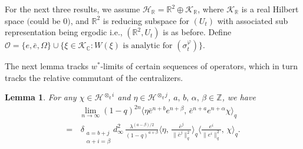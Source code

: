 \documentclass[12pt, a4paper,reqno]{amsart}
\newtheorem{Lemma}[Theorem]{Lemma}
\theoremstyle{definition}
\def\C{\mathbb C}
\def\R{\mathbb R}
\newcommand{\CH}{\mathcal{H}}
\begin{document}
For the next three results, we assume $\CH_\R= \mathbb{R}^2\oplus \mathcal{K}_\R$, where $\mathcal{K}_\R$ is a real Hilbert space $($could be $0)$, and $\mathbb{R}^2$ is reducing subspace for $(U_t)$ with associated sub representation being ergodic i.e., $(\mathbb{R}^2, U_t)$ is as before. Define $\mathcal{O}=\{e,\bar e,\Omega\}\cup \{\xi\in \mathcal{K}_\C: W(\xi) \text{ is analytic for }(\sigma_t^\varphi)\}$. 


The next lemma tracks $w^*$-limits of certain sequences of operators, which in turn tracks the relative commutant of the centralizers.


\begin{Lemma}\label{comp}
For any $\chi \in \CH^{\otimes_q i}$ and $\eta\in \CH^{\otimes_q j}$, $a,\, b,\, \alpha,\, \beta\in \mathbb Z$, we have 
\begin{align*}
&\lim_{n\to \infty} (1-q)^{2n}\langle \eta \bar{e}^{n+b }e^{n+\beta},\,\bar{e}^{n+a}e^{n+\alpha}\chi
\rangle_q\\
=&\,\delta_{\substack{a=b+j\\\alpha+i=\beta}}{d_\infty^2}\, \frac {\lambda^{(a-\beta)/2}}{(1-q)^{a+ \beta}}
\langle \eta,\,\frac{\bar{e}^j}{\|\bar{e}^j\|_q^2}\rangle_q \langle \frac{{e}^i}{\|e^i\|_q^2},\,\chi\rangle_q.
\end{align*} 
\end{Lemma}
\end{document}
